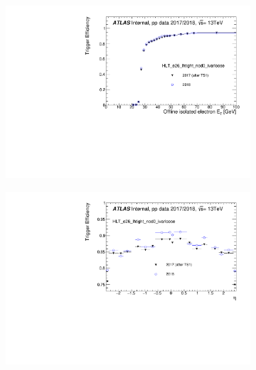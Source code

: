 

\begin{figure}[h!tb]
\centering
\begin{subfigure}[c]{.48\textwidth}
\includegraphics[width=\textwidth]{sections/operation/figures/efficiencies/eff_EGAM1_e26_lhtight_nod0_ivarloose_2017_after_ts1_and_2018_et.pdf}
\caption{}
\end{subfigure}
\hfill
\begin{subfigure}[c]{.48\textwidth}
\includegraphics[width=\textwidth]{sections/operation/figures/efficiencies/eff_EGAM1_e26_lhtight_nod0_ivarloose_2017_after_ts1_and_2018_eta.pdf}

\end{subfigure}
\end{figure}
